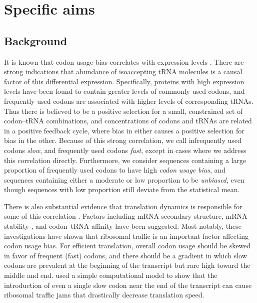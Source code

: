 \documentclass[11pt]{nih}
\begin{document}


\section{Specific aims}


\subsection{Background}


It is known that codon usage bias correlates with expression levels \citep{Goetz2005,Gustafsson2004}. There are strong indications that abundance of isoaccepting tRNA molecules \citep{Klumpp2012,Plotkin2011,Najafabadi2007,Tavare1989} is a causal factor of this differential expression. Specifically, proteins with high expression levels have been found to contain greater levels of commonly used codons, and frequently used codons are associated with higher levels of corresponding tRNAs. Thus there is believed to be a positive selection for a small, constrained set of codon--tRNA combinations, and concentrations of codons and tRNAs are related in a positive feedback cycle, where bias in either causes a positive selection for bias in the other. Because of this strong correlation, we call infrequently used codons \emph{slow}, and frequently used codons \emph{fast}, except in cases where we address this correlation directly. Furthermore, we consider sequences containing a large proportion of frequently used codons to have high \emph{codon usage bias}, and sequences containing either a moderate or low proportion to be \emph{unbiased}, even though sequences with low proportion still deviate from the statistical mean.

There is also substantial evidence that translation dynamics is responsible for some of this correlation \citep{Bentele2013,Mitarai2013,Cannarozzi2010,Fredrick2010,Marin2008,Buchan2007}. Factors including mRNA secondary structure, mRNA stability \citep{Gu2010}, and codon--tRNA affinity have been suggested. Most notably, these investigations have shown that ribosomal traffic is an important factor affecting codon usage bias. For efficient translation, overall codon usage should be skewed in favor of frequent (fast) codons, and there should be a gradient in which slow codons are prevalent at the beginning of the transcript but rare high toward the middle and end. \citet{Mitarai2013} used a simple computational model to show that the introduction of even a single slow codon near the end of the transcript can cause ribosomal traffic jams that drastically decrease translation speed.
\end{document}
